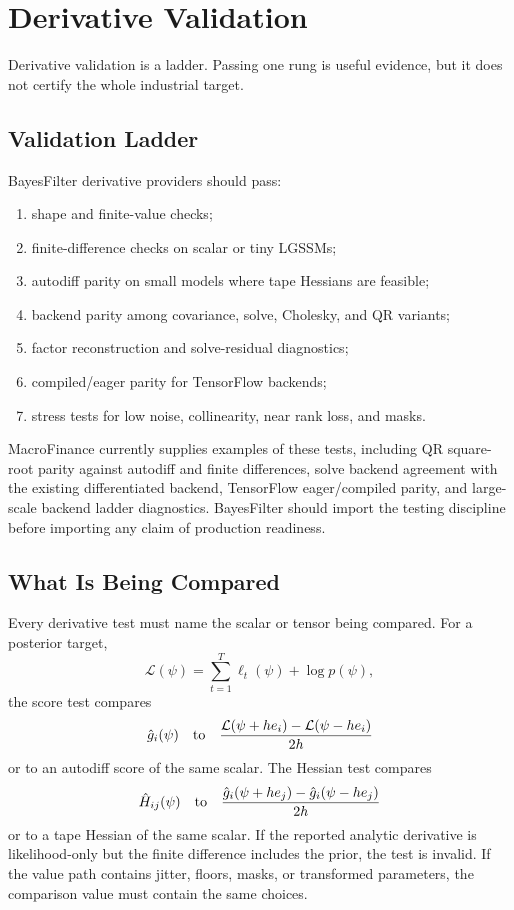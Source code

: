 \chapter{Derivative Validation}
\label{ch:bf-derivative-validation}

Derivative validation is a ladder.  Passing one rung is useful evidence, but it
does not certify the whole industrial target.

\section{Validation Ladder}
\label{sec:bf-derivative-validation-ladder}

BayesFilter derivative providers should pass:
\begin{enumerate}[label=(\roman*)]
  \item shape and finite-value checks;
  \item finite-difference checks on scalar or tiny LGSSMs;
  \item autodiff parity on small models where tape Hessians are feasible;
  \item backend parity among covariance, solve, Cholesky, and QR variants;
  \item factor reconstruction and solve-residual diagnostics;
  \item compiled/eager parity for TensorFlow backends;
  \item stress tests for low noise, collinearity, near rank loss, and masks.
\end{enumerate}

MacroFinance currently supplies examples of these tests, including QR
square-root parity against autodiff and finite differences, solve backend
agreement with the existing differentiated backend, TensorFlow eager/compiled
parity, and large-scale backend ladder diagnostics.  BayesFilter should import
the testing discipline before importing any claim of production readiness.

\section{What Is Being Compared}
\label{sec:bf-validation-comparison-target}

Every derivative test must name the scalar or tensor being compared.  For a
posterior target,
\[
  \mathcal{L}(\psi)
  =
  \sum_{t=1}^T\ell_t(\psi)+\log p(\psi),
\]
the score test compares
\[
  \hat g_i(\psi)
  \quad\hbox{to}\quad
  \frac{\mathcal{L}(\psi+h e_i)-\mathcal{L}(\psi-h e_i)}{2h}
\]
or to an autodiff score of the same scalar.  The Hessian test compares
\[
  \hat H_{ij}(\psi)
  \quad\hbox{to}\quad
  \frac{\hat g_i(\psi+h e_j)-\hat g_i(\psi-h e_j)}{2h}
\]
or to a tape Hessian of the same scalar.  If the reported analytic derivative is
likelihood-only but the finite difference includes the prior, the test is
invalid.  If the value path contains jitter, floors, masks, or transformed
parameters, the comparison value must contain the same choices.

